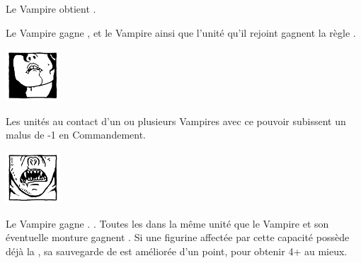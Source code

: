 \begin{multicols}{2}
\startpricelist

 Le Vampire obtient .

 Le Vampire gagne \awaken{\zombies, \direwolves, \batswarms, \greatbats}, et le Vampire ainsi que l'unité qu'il rejoint gagnent la règle \swiftstride{}.

\endpricelist

\begin{center}\includegraphics[width=2cm]{logos/logo_lamia.png}\end{center}
\vspace*{-1.2cm}

\startpricelist

 

 Les unités au contact d'un ou plusieurs Vampires avec ce pouvoir subissent un malus de -1 en Commandement.

\endpricelist

\columnbreak
\begin{center}\includegraphics[width=2cm]{logos/logo_strigoi.png}\end{center}
\vspace*{-1.2cm}

\startpricelist

 Le Vampire gagne . . Toutes les \ghouls{} dans la même unité que le Vampire et son éventuelle monture gagnent . Si une figurine affectée par cette capacité possède déjà la \regeneration{}, sa sauvegarde de \regeneration{} est améliorée d'un point, pour obtenir 4+ au mieux.


\end{multicols}
